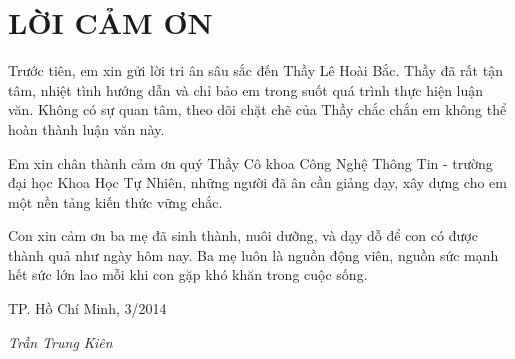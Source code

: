 \newpage
\chapter*{LỜI CẢM ƠN}
Trước tiên, em xin gửi lời tri ân sâu sắc đến Thầy Lê Hoài Bắc. Thầy đã rất tận tâm, nhiệt tình hướng dẫn và chỉ bảo em trong suốt quá trình thực hiện luận văn. Không có sự quan tâm, theo dõi chặt chẽ của Thầy chắc chắn em không thể hoàn thành luận văn này.

Em xin chân thành cảm ơn quý Thầy Cô khoa Công Nghệ Thông Tin - trường đại học Khoa Học Tự Nhiên, những người đã ân cần giảng dạy, xây dựng cho em một nền tảng kiến thức vững chắc. 

Con xin cảm ơn ba mẹ đã sinh thành, nuôi dưỡng, và dạy dỗ để con có được thành quả như ngày hôm nay. Ba mẹ luôn là nguồn động viên, nguồn sức mạnh hết sức lớn lao mỗi khi con gặp khó khăn trong cuộc sống.

\hfill TP. Hồ Chí Minh, 3/2014

\hfill \textit{Trần Trung Kiên}
